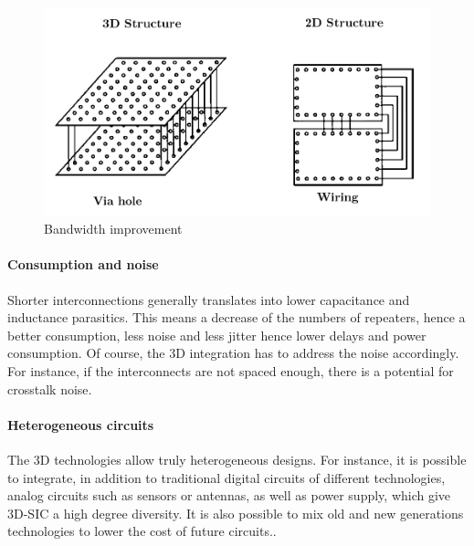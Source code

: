 \begin{figure}[h!]
\begin{center}
\includegraphics[width=0.75\linewidth]{bandwidth.png}
\end{center}
\vspace{-0.5cm}
\caption{Bandwidth improvement \cite{659500}}
\label{fig:bandwidth}
\end{figure}

\paragraph{Consumption and noise}

Shorter interconnections generally translates into lower capacitance and inductance parasitics. This means a decrease of the numbers of repeaters, hence a better consumption, less noise and less jitter hence lower delays and power consumption. Of course, the 3D integration has to address the noise accordingly. For instance, if the interconnects are not spaced enough, there is a potential for crosstalk noise.

\paragraph{Heterogeneous circuits}

The 3D technologies allow truly heterogeneous designs. For instance, it is possible to integrate, in addition to traditional digital circuits of different technologies, analog circuits such as sensors or antennas, as well as power supply, which give 3D-SIC a high degree diversity. It is also possible to mix old and new generations technologies to lower the cost of future circuits.\cite{4299568}.


